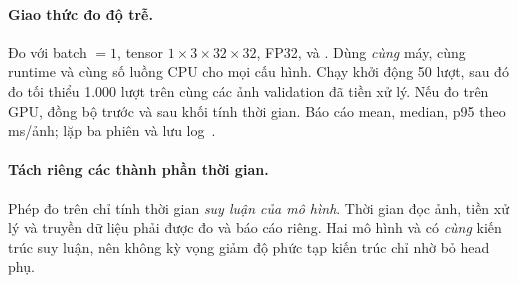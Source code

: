\paragraph{Giao thức đo độ trễ.} Đo với batch $=1$, tensor $1 \times 3 \times 32 \times 32$,
FP32,  và . Dùng \emph{cùng} máy, cùng runtime
và cùng số luồng CPU cho mọi cấu hình. Chạy khởi động 50 lượt, sau đó đo tối thiểu 1.000 lượt
trên cùng các ảnh validation đã tiền xử lý. Nếu đo trên GPU, đồng bộ trước và sau khối tính thời
gian. Báo cáo mean, median, p95 theo ms/ảnh; lặp ba phiên và lưu log~\cite{pytorch_benchmark}.

\paragraph{Tách riêng các thành phần thời gian.} Phép đo trên chỉ tính thời gian \emph{suy luận
của mô hình}. Thời gian đọc ảnh, tiền xử lý và truyền dữ liệu phải được đo và báo cáo riêng.
Hai mô hình  và  có \emph{cùng} kiến trúc suy luận, nên không kỳ vọng giảm độ
phức tạp kiến trúc chỉ nhờ bỏ head phụ.

